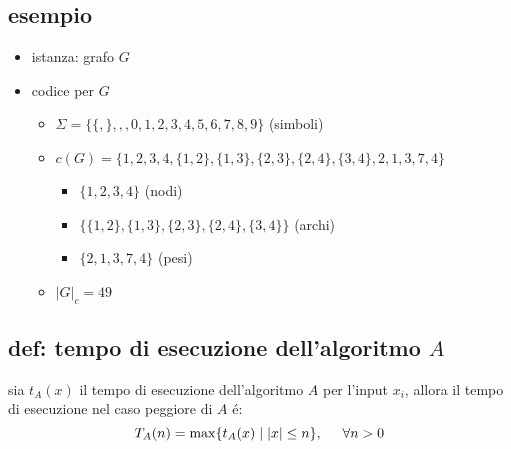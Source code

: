 \subsection{esempio}
\begin{flushleft}
	\begin{itemize}
		\item istanza: grafo $G$
	\end{itemize}
\end{flushleft}
\begin{center}
\end{center}
\begin{flushleft}
	\begin{itemize}
		\item codice per $G$
		\begin{itemize}
			\item $\Sigma=\{\{,\},,,0,1,2,3,4,5,6,7,8,9\}$ (simboli)
			\item $c(G)=\{1,2,3,4,\{1,2\},\{1,3\},\{2,3\},\{2,4\},\{3,4\},2,1,3,7,4\}$
			\begin{itemize}
				\item $\{1,2,3,4\}$ (nodi)
				\item $\{\{1,2\},\{1,3\},\{2,3\},\{2,4\},\{3,4\}\}$ (archi)
				\item $\{2,1,3,7,4\}$ (pesi)
			\end{itemize}
			\item $|G|_{c}=49$
		\end{itemize}
	\end{itemize}
\end{flushleft}

\subsection{def: tempo di esecuzione dell'algoritmo $A$}
\begin{flushleft}
	sia $t_{A}(x)$ il tempo di esecuzione dell'algoritmo $A$ per l'input $x_{i}$, allora il tempo di esecuzione nel caso peggiore di $A$ \'e:
	$$T_{A}(n)=\max\{t_{A}(x)\hspace{0.1cm}|\hspace{0.1cm}|x|\leq n\},\hspace{0.5cm}\forall n>0$$
\end{flushleft}

